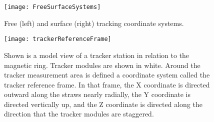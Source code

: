\begin{figure}[]
  \centering
  \texttt{[image: FreeSurfaceSystems]}
    \caption[Free and surface tracking coordinate systems]{Free (left) and surface (right) tracking coordinate systems.}
    \label{fig:FreeSurfaceSystems}
\end{figure}

\begin{figure}[]
  \centering
  \texttt{[image: trackerReferenceFrame]}
    \caption[Tracker reference frame]{Shown is a model view of a tracker station in relation to the magnetic ring. Tracker modules are shown in white. Around the tracker measurement area is defined a coordinate system called the tracker reference frame. In that frame, the X coordinate is directed outward along the straws nearly radially, the Y coordinate is directed vertically up, and the Z coordinate is directed along the direction that the tracker modules are staggered.}
    \label{fig:trackerReferenceFrame}
\end{figure}



